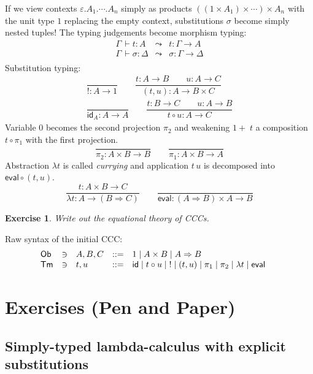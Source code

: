 \documentclass[a4paper,fleqn]{scrartcl}
\newtheorem{exercise}{Exercise}
\newcommand{\Ob}{\mathsf{Ob}}
\newcommand{\tid}{\mathsf{id}}
\newcommand{\comp}{\circ}
\newcommand{\To}{\Rightarrow}
\newcommand{\too}{\longrightarrow}
\newcommand{\teval}{\mathsf{eval}}
\newcommand{\der}{\,\vdash}
\newcommand{\ru}[2]{\dfrac{#1}{#2}}
\newcommand{\Tm}{\mathsf{Tm}}
\newcommand{\Ge}{\ensuremath{\varepsilon}}
\newcommand{\Gs}{\ensuremath{\sigma}}
\begin{document}
If we view contexts $\Ge.A_1.\cdots.A_n$ simply as products
$((1 \times A_1) \times \cdots) \times A_n$ with the unit type $1$
replacing the empty context, substitutions $\Gs$ become simply nested
tuples!  The typing judgements become morphism typing:
\[
\begin{array}{lcl}
  \Gamma \der t : A & \leadsto & t : \Gamma \too A \\
  \Gamma \der \Gs : \Delta & \leadsto & \Gs : \Gamma \too \Delta \\
\end{array}
\]
Substitution typing:
\begin{gather*}
  \ru{}{! : A \to 1}
\qquad
  \ru{t : A \to B \qquad u : A \to C
    }{(t,u) : A \to B \times C}
\\[2ex]
  \ru{}{\tid_A : A \too A}
\qquad
  \ru{t : B \too C \qquad u : A \too B}{t \comp u : A \too C}
\end{gather*}
Variable $0$ becomes the second projection $\pi_2$ and weakening $1{+}\;t$ a composition $t \comp \pi_1$ with the first projection.
\[
  \ru{}{\pi_2 : A \times B \too B}
\qquad
  \ru{}{\pi_1 : A \times B \too A}
\]
Abstraction $\lambda t$ is called \emph{currying} and application $t\,u$ is decomposed into $\teval \comp (t,u)$.
\[
  \ru{t : A \times B \too C}{\lambda t : A \too (B \To C)}
\qquad
  \ru{}{\teval : (A \To B) \times A \too B}
\]
\begin{exercise}
Write out the equational theory of CCCs.
\end{exercise}


Raw syntax of the initial CCC:
\[
\begin{array}{lllrl@{\qquad}l}
\Ob & \ni & A,B,C & ::= & 1 \mid A \times B \mid A \To B \\
\Tm & \ni & t,u   & ::= & \tid \mid t \comp u \mid {!} \mid (t,u) \mid \pi_1 \mid \pi_2 \mid \lambda t \mid \teval \\
\end{array}
\]

\clearpage

\section{Exercises (Pen and Paper)}

\subsection{Simply-typed lambda-calculus with explicit substitutions}
\end{document}
